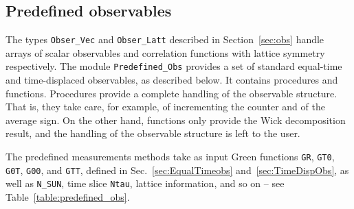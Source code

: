 %
\subsection{Predefined observables} \label{sec:predefined_observales}

The types \texttt{Obser\_Vec} and \texttt{Obser\_Latt} described in Section~\ref{sec:obs} handle arrays of scalar observables and correlation functions with lattice symmetry respectively.
The module \texttt{Predefined\_Obs} provides a set of standard equal-time and time-displaced observables, as described below.  
It contains procedures and functions.   Procedures  provide a complete handling of the observable structure. That is, they take care, for example, of incrementing the counter and of the average sign. On the other hand, functions only provide the Wick decomposition result, and the handling of the observable structure is left to the user. 

The predefined measurements methods take as input Green functions \texttt{GR}, \texttt{GT0}, \texttt{G0T}, \texttt{G00}, and \texttt{GTT}, defined in Sec.~\ref{sec:EqualTimeobs} and~\ref{sec:TimeDispObs}, as well as \texttt{N\_SUN}, time slice \texttt{Ntau}, lattice information, and so on -- see Table~\ref{table:predefined_obs}. 

